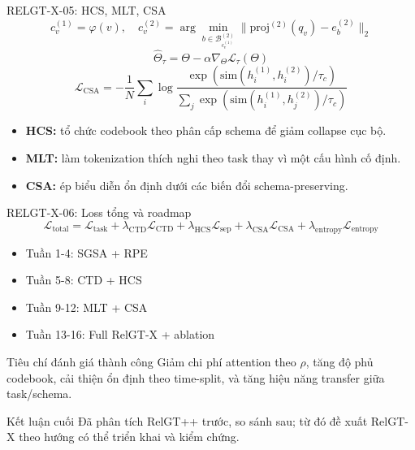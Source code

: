 \documentclass[aspectratio=169,11pt]{beamer}
\begin{document}
\begin{frame}{RELGT-X-05: HCS, MLT, CSA}
  \[
    c_v^{(1)}=\varphi(v),\quad
    c_v^{(2)}=\arg\min_{b\in\mathcal{B}^{(2)}_{c_v^{(1)}}}\|\text{proj}^{(2)}(q_v)-e_b^{(2)}\|_2
  \]
  \[
    \hat\Theta_\tau=\Theta-\alpha\nabla_\Theta \mathcal{L}_\tau(\Theta)
  \]
  \[
    \mathcal{L}_\text{CSA}
    =-\frac1N\sum_i\log\frac{\exp(\text{sim}(h_i^{(1)},h_i^{(2)})/\tau_c)}
    {\sum_j\exp(\text{sim}(h_i^{(1)},h_j^{(2)})/\tau_c)}
  \]
  \begin{itemize}
    \item \textbf{HCS:} tổ chức codebook theo phân cấp schema để giảm collapse cục bộ.
    \item \textbf{MLT:} làm tokenization thích nghi theo task thay vì một cấu hình cố định.
    \item \textbf{CSA:} ép biểu diễn ổn định dưới các biến đổi schema-preserving.
  \end{itemize}
\end{frame}

\begin{frame}{RELGT-X-06: Loss tổng và roadmap}
  \[
    \mathcal{L}_\text{total}
    =\mathcal{L}_\text{task}
    +\lambda_\text{CTD}\mathcal{L}_\text{CTD}
    +\lambda_\text{HCS}\mathcal{L}_\text{sep}
    +\lambda_\text{CSA}\mathcal{L}_\text{CSA}
    +\lambda_\text{entropy}\mathcal{L}_\text{entropy}
  \]
  \begin{itemize}
    \item Tuần 1-4: SGSA + RPE
    \item Tuần 5-8: CTD + HCS
    \item Tuần 9-12: MLT + CSA
    \item Tuần 13-16: Full RelGT-X + ablation
  \end{itemize}
  \begin{block}{Tiêu chí đánh giá thành công}
    Giảm chi phí attention theo $\rho$, tăng độ phủ codebook, cải thiện ổn định theo time-split, và tăng hiệu năng transfer giữa task/schema.
  \end{block}
  \begin{exampleblock}{Kết luận cuối}
    Đã phân tích RelGT++ trước, so sánh sau; từ đó đề xuất RelGT-X theo hướng có thể triển khai và kiểm chứng.
  \end{exampleblock}
\end{frame}
\end{document}
